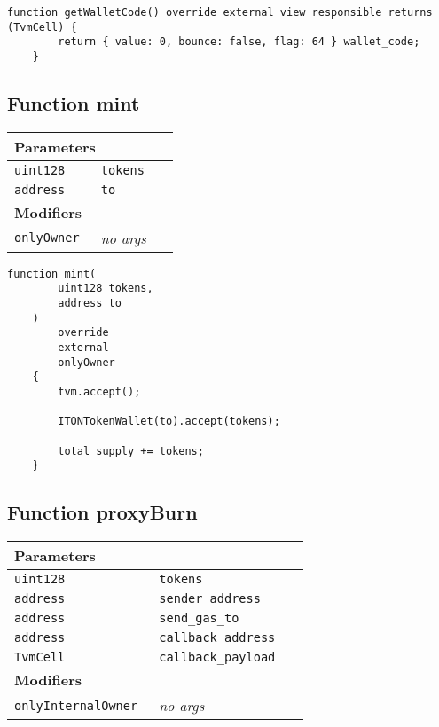 \begin{lstlisting}[firstnumber=100]
    function getWalletCode() override external view responsible returns (TvmCell) {
        return { value: 0, bounce: false, flag: 64 } wallet_code;
    }
\end{lstlisting}

\subsection{Function mint}


\ifsoltables
\noindent\begin{tabular}{|l|l|p{5cm}|}\hline
\multicolumn{3}{|l|}{\bf Parameters}\\\hline
\tt uint128 & \tt tokens &\\\hline
\tt address & \tt to &\\\hline
\multicolumn{3}{|l|}{\bf Modifiers}\\\hline
\tt onlyOwner & {\em no args} &\\\hline
\end{tabular}
\fi

\vspace{2cm}

\begin{lstlisting}[firstnumber=282]
    function mint(
        uint128 tokens,
        address to
    )
        override
        external
        onlyOwner
    {
        tvm.accept();

        ITONTokenWallet(to).accept(tokens);

        total_supply += tokens;
    }
\end{lstlisting}

\subsection{Function proxyBurn}


\ifsoltables
\noindent\begin{tabular}{|l|l|p{5cm}|}\hline
\multicolumn{3}{|l|}{\bf Parameters}\\\hline
\tt uint128 & \tt tokens &\\\hline
\tt address & \tt sender\_{}address &\\\hline
\tt address & \tt send\_{}gas\_{}to &\\\hline
\tt address & \tt callback\_{}address &\\\hline
\tt TvmCell & \tt callback\_{}payload &\\\hline
\multicolumn{3}{|l|}{\bf Modifiers}\\\hline
\tt onlyInternalOwner & {\em no args} &\\\hline
\end{tabular}
\fi


